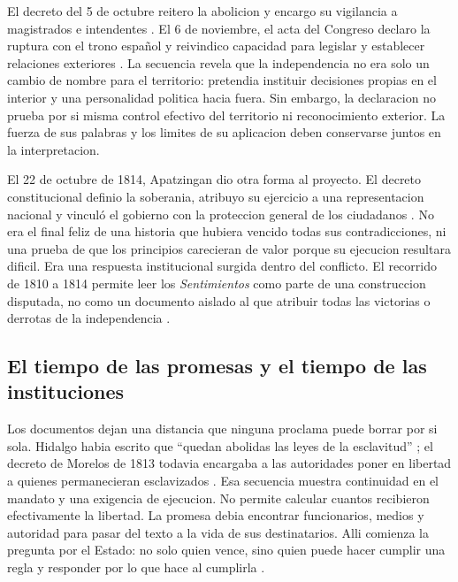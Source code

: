 \documentclass[spanish,letterpaper,oneside]{article}
\begin{document}
El decreto del 5 de octubre reitero la abolicion y encargo su
vigilancia a magistrados e intendentes
\citep[pp.~91--92]{morelosAbolicion2021}. El 6 de noviembre, el
acta del Congreso declaro la ruptura con el trono español y
reivindico capacidad para legislar y establecer relaciones
exteriores \citep[pp.~95--96]{congresoActa2021}. La secuencia
revela que la independencia no era solo un cambio de nombre
para el territorio: pretendia instituir decisiones propias
en el interior y una personalidad politica hacia fuera.
Sin embargo, la declaracion no prueba por si misma control
efectivo del territorio ni reconocimiento exterior. La fuerza
de sus palabras y los limites de su aplicacion deben conservarse
juntos en la interpretacion.

El 22 de octubre de 1814, Apatzingan dio otra forma al proyecto.
El decreto constitucional definio la soberania, atribuyo su
ejercicio a una representacion nacional y vinculó el gobierno
con la proteccion general de los ciudadanos
\citep[arts.~2--5, p.~104]{congresoApatzingan2021}. No era el
final feliz de una historia que hubiera vencido todas sus
contradicciones, ni una prueba de que los principios carecieran
de valor porque su ejecucion resultara dificil. Era una
respuesta institucional surgida dentro del conflicto. El
recorrido de 1810 a 1814 permite leer los \emph{Sentimientos}
como parte de una construccion disputada, no como un documento
aislado al que atribuir todas las victorias o derrotas de la
independencia \citep{fernandez2021}.

\subsection{El tiempo de las promesas y el tiempo de las instituciones}

Los documentos dejan una distancia que ninguna proclama puede borrar
por si sola. Hidalgo habia escrito que ``quedan abolidas las leyes de la
esclavitud'' \citep[p.~38]{hidalgo2021}; el decreto de Morelos de 1813
todavia encargaba a las autoridades poner en libertad a quienes
permanecieran esclavizados \citep[p.~91]{morelosAbolicion2021}. Esa
secuencia muestra continuidad en el mandato y una exigencia de
ejecucion. No permite calcular cuantos recibieron efectivamente la
libertad. La promesa debia encontrar funcionarios, medios y autoridad
para pasar del texto a la vida de sus destinatarios. Alli comienza la
pregunta por el Estado: no solo quien vence, sino quien puede hacer
cumplir una regla y responder por lo que hace al cumplirla
\citep{andrade2003,garciaRicci2011}.
\end{document}
